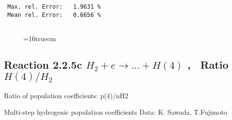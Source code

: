 \documentclass[12pt,dvipdfmx]{article}
\begin{document}
\begin{small}
\begin{verbatim}
 Max. rel. Error:   1.9631 %
 Mean rel. Error:   0.6656 %


\end{verbatim}\end{small}
\begin{figure} \label{2.2.5b}
\epsfxsize=16truecm
\end{figure}
\newpage

\subsection{
Reaction 2.2.5c  $H_2 + e \rightarrow ...+ H(4) $ , \   Ratio $H(4)/H_2 $
}

 Ratio of population coefficients: p(4)/nH2

 Multi-step hydrogenic population coefficients
 Data: K. Sawada, T.Fujimoto \cite{kn:Sawada}
\end{document}

